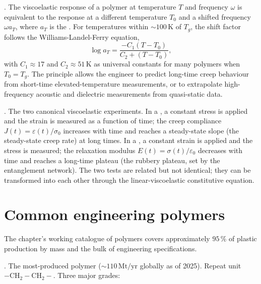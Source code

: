 . The
viscoelastic response of a polymer at temperature $T$ and frequency
$\omega$ is equivalent to the response at a different temperature
$T_0$ and a shifted frequency $\omega a_T$, where $a_T$ is the
. For temperatures within $\sim 100\,\si{\kelvin}$
of $T_g$, the shift factor follows the Williams-Landel-Ferry equation,
\[
\log a_T = \frac{-C_1 (T - T_0)}{C_2 + (T - T_0)},
\]
with $C_1 \approx 17$ and $C_2 \approx 51\,\si{\kelvin}$ as universal
constants for many polymers when $T_0 = T_g$. The principle allows
the engineer to predict long-time creep behaviour from short-time
elevated-temperature measurements, or to extrapolate high-frequency
acoustic and dielectric measurements from quasi-static data.

. The two canonical viscoelastic
experiments. In a , a constant stress is applied
and the strain is measured as a function of time; the creep
compliance $J(t) = \varepsilon(t)/\sigma_0$ increases with time and
reaches a steady-state slope (the steady-state creep rate) at long
times. In a , a constant strain is
applied and the stress is measured; the relaxation modulus $E(t) =
\sigma(t)/\varepsilon_0$ decreases with time and reaches a long-time
plateau (the rubbery plateau, set by the entanglement network). The
two tests are related but not identical; they can be transformed
into each other through the linear-viscoelastic constitutive
equation.

\section{Common engineering polymers}

The chapter's working catalogue of polymers covers approximately
$95\,\%$ of plastic production by mass and the bulk of engineering
specifications.

. The most-produced polymer ($\sim 110\,
\text{Mt}/\text{yr}$ globally as of 2025). Repeat unit
$-\text{CH}_2-\text{CH}_2-$. Three major grades:

